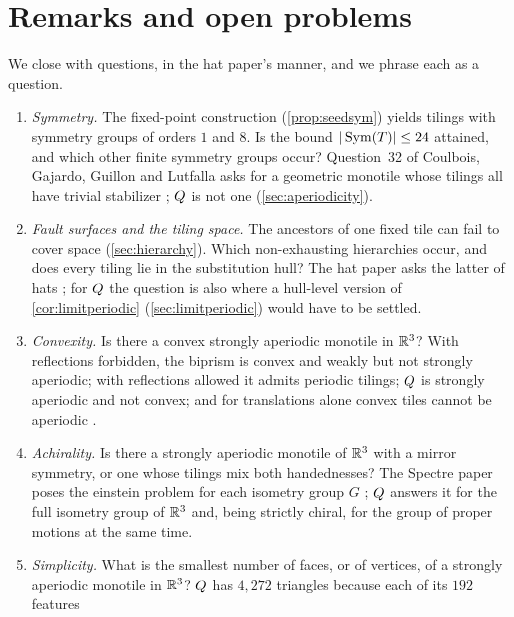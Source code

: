 \section{Remarks and open problems}\label{sec:remarks}

We close with questions, in the hat paper's manner, and we phrase each as a question.

\begin{enumerate}[label=\textup{(\arabic*)}, leftmargin=*]
  \item \emph{Symmetry.} The fixed-point construction (\cref{prop:seedsym}) yields tilings with
    symmetry groups of orders $1$ and $8$. Is the bound $|\operatorname{Sym}(T)|\le24$ attained, and which
    other finite symmetry groups occur? Question~32 of Coulbois, Gajardo, Guillon and Lutfalla
    asks for a geometric monotile whose tilings all have trivial stabilizer \cite{CGGL24};
    $Q$ is not one (\cref{sec:aperiodicity}).
  \item \emph{Fault surfaces and the tiling space.} The ancestors of one fixed tile can fail to
    cover space (\cref{sec:hierarchy}). Which non-exhausting hierarchies occur, and does every
    tiling lie in the substitution hull? The hat paper asks the latter of hats \cite{SMKGS24}; for
    $Q$ the question is also where a hull-level version of \cref{cor:limitperiodic}
    (\cref{sec:limitperiodic}) would
    have to be settled.
  \item \emph{Convexity.} Is there a convex strongly aperiodic monotile in $\mathbb{R}^3$? With
    reflections forbidden, the biprism is convex and weakly but not strongly aperiodic; with
    reflections allowed it admits periodic tilings; $Q$ is strongly aperiodic and not convex;
    and for translations alone convex tiles cannot be aperiodic \cite{CGGL24}.
  \item \emph{Achirality.} Is there a strongly aperiodic monotile of $\mathbb{R}^3$ with a mirror symmetry,
    or one whose tilings mix both handednesses? The Spectre paper poses the einstein problem for
    each isometry group $G$ \cite{SMKGS24b}; $Q$ answers it for the full isometry group of
    $\mathbb{R}^3$ and, being strictly chiral, for the group of proper motions at the same time.
  \item \emph{Simplicity.} What is the smallest number of faces, or of vertices, of a strongly
    aperiodic monotile in $\mathbb{R}^3$? $Q$ has $4{,}272$ triangles because each of its $192$ features

\end{enumerate}
